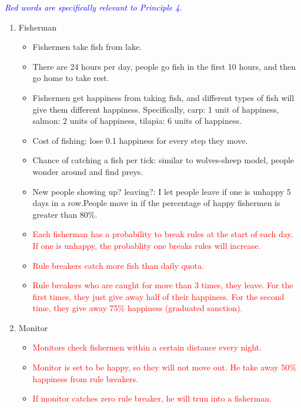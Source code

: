 \documentclass[12pt]{article}
\begin{document}
\textit{\textcolor{blue}{Red words are specifically relevant to Principle 4.}}
\begin{enumerate}
	
	\item Fisherman
	\begin{itemize}
		\item Fishermen take fish from lake.
		\item There are 24 hours per day, people go fish in the first 10 hours, and then go home to take rest.
		\item Fishermen get happiness from taking fish, and different types of fish will give them different happiness. Specifically, carp: 1 unit of happiness, salmon: 2 units of happiness, tilapia: 6 units of happiness.
		\item Cost of fishing: lose 0.1 happiness for every step they move.
		\item Chance of catching a fish per tick: similar to wolves-sheep model, people wonder around and find preys.
		\item New people showing up? leaving?: I let people leave if one is unhappy 5 days in a row.People move in if the percentage of happy fishermen is greater than 80\%.
		\item \textcolor{red}{Each fisherman has a probability to break rules at the start of each day. If one is unhappy, the probablity one breaks rules will increase.}
		\item \textcolor{red}{Rule breakers catch more fish than daily quota.}
		\item \textcolor{red}{Rule breakers who are caught for more than 3 times, they leave. For the first times, they just give away half of their happiness. For the second time, they give away 75\% happiness (graduated sanction).}
	\end{itemize}

    
    \item Monitor
    \begin{itemize}
    	\item \textcolor{red}{Monitors check fishermen within a certain distance every night.}
    	\item \textcolor{red}{Monitor is set to be happy, so they will not move out. He take away 50\% happiness from rule breakers.}
    	\item {\textcolor{red}{If monitor catches zero rule breaker, he will trun into a fisherman.}}
    \end{itemize}


\end{enumerate}
\end{document}
